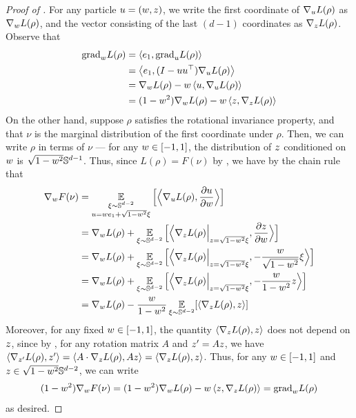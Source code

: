 \begin{proof}[Proof of ]
For any particle $u = (w, z)$, we write the first coordinate of $\nabla_u L(\rho)$ as $\nabla_w L(\rho)$, and the vector consisting of the last $(d - 1)$ coordinates as $\nabla_z L(\rho)$. Observe that
\begin{align}
{\textup{grad}}_w L(\rho)
& = \left<e_1, {\textup{grad}}_u L(\rho)\right> \\
& = \left<e_1, (I - u u^\top) \nabla_u L(\rho)\right> \\
& = \nabla_w L(\rho) - w \left<u, \nabla_u L(\rho)\right> \\
& = (1 - w^2) \nabla_w L(\rho) - w \left<z, \nabla_z L(\rho)\right>
\end{align}
On the other hand, suppose $\rho$ satisfies the rotational invariance property, and that $\nu$ is the marginal distribution of the first coordinate under $\rho$. Then, we can write $\rho$ in terms of $\nu$ --- for any $w \in [-1, 1]$, the distribution of $z$ conditioned on $w$ is $\sqrt{1 - w^2} \mathbb{S}^{d - 1}$. Thus, since $L(\rho) = F(\nu)$ by , we have by the chain rule that
\begin{align}
\nabla_w F(\nu)
& = \operatorname*{\mathbb{E}}_{\substack{\xi \sim \mathbb{S}^{d - 2} \\ u = w e_1 + \sqrt{1 - w^2} \xi}} \Big[ \Big\langle \nabla_u L(\rho), \frac{\partial u}{\partial w} \Big\rangle \Big] \\
& = \nabla_w L(\rho) + \operatorname*{\mathbb{E}}_{\xi \sim \mathbb{S}^{d - 2}} \Big[ \Big\langle \nabla_z L(\rho) \Big|_{z = \sqrt{1 - w^2} \xi}, \frac{\partial z}{\partial w} \Big\rangle \Big] \\
& = \nabla_w L(\rho) + \operatorname*{\mathbb{E}}_{\xi \sim \mathbb{S}^{d - 2}} \Big[ \Big\langle \nabla_z L(\rho) \Big|_{z = \sqrt{1 - w^2} \xi}, -\frac{w}{\sqrt{1 - w^2}} \xi \Big\rangle \Big] \\
& = \nabla_w L(\rho) + \operatorname*{\mathbb{E}}_{\xi \sim \mathbb{S}^{d - 2}} \Big[ \Big\langle \nabla_z L(\rho) \Big|_{z = \sqrt{1 - w^2} \xi}, -\frac{w}{1 - w^2} z \Big\rangle \Big] \\
& = \nabla_w L(\rho) - \frac{w}{1 - w^2} \operatorname*{\mathbb{E}}_{\xi \sim \mathbb{S}^{d - 2}} [\langle \nabla_z L(\rho), z \rangle]
\end{align}
Moreover, for any fixed $w \in [-1, 1]$, the quantity $\langle \nabla_z L(\rho), z \rangle$ does not depend on $z$, since by , for any rotation matrix $A$ and $z' = Az$, we have $\langle \nabla_{z'} L(\rho), z' \rangle = \langle A \cdot \nabla_z L(\rho), A z \rangle = \langle \nabla_z L(\rho), z \rangle$. Thus, for any $w \in [-1, 1]$ and $z \in \sqrt{1 - w^2} \mathbb{S}^{d - 2}$, we can write
\begin{align}
(1 - w^2) \nabla_w F(\nu)
= (1 - w^2) \nabla_w L(\rho) - w \left<z, \nabla_z L(\rho)\right>
= {\textup{grad}}_w L(\rho)
\end{align}
as desired.
\end{proof}

